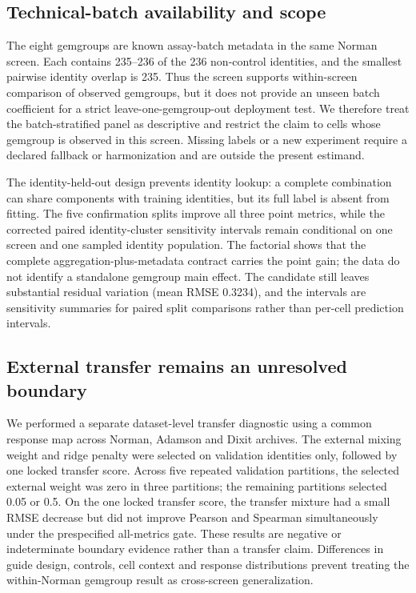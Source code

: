 \documentclass[10pt]{article}
\begin{document}
\subsection{Technical-batch availability and scope}
The eight gemgroups are known assay-batch metadata in the same Norman screen. Each contains 235--236 of the 236 non-control identities, and the smallest pairwise identity overlap is 235. Thus the screen supports within-screen comparison of observed gemgroups, but it does not provide an unseen batch coefficient for a strict leave-one-gemgroup-out deployment test. We therefore treat the batch-stratified panel as descriptive and restrict the claim to cells whose gemgroup is observed in this screen. Missing labels or a new experiment require a declared fallback or harmonization and are outside the present estimand.

The identity-held-out design prevents identity lookup: a complete combination can share components with training identities, but its full label is absent from fitting. The five confirmation splits improve all three point metrics, while the corrected paired identity-cluster sensitivity intervals remain conditional on one screen and one sampled identity population. The factorial shows that the complete aggregation-plus-metadata contract carries the point gain; the data do not identify a standalone gemgroup main effect. The candidate still leaves substantial residual variation (mean RMSE 0.3234), and the intervals are sensitivity summaries for paired split comparisons rather than per-cell prediction intervals.

\subsection{External transfer remains an unresolved boundary}
We performed a separate dataset-level transfer diagnostic using a common response map across Norman, Adamson and Dixit archives. The external mixing weight and ridge penalty were selected on validation identities only, followed by one locked transfer score. Across five repeated validation partitions, the selected external weight was zero in three partitions; the remaining partitions selected 0.05 or 0.5. On the one locked transfer score, the transfer mixture had a small RMSE decrease but did not improve Pearson and Spearman simultaneously under the prespecified all-metrics gate. These results are negative or indeterminate boundary evidence rather than a transfer claim. Differences in guide design, controls, cell context and response distributions prevent treating the within-Norman gemgroup result as cross-screen generalization.
\end{document}
